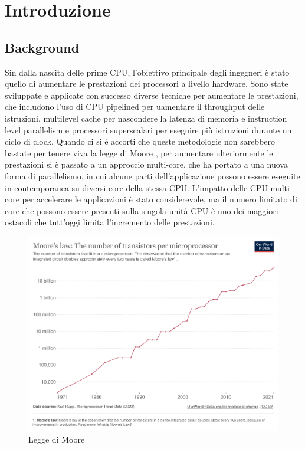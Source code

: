 \chapter{Introduzione}
\label{sec:intro}


\section[Background]{Background}

Sin dalla nascita delle prime \gls{CPU}, l'obiettivo principale degli ingegneri è stato quello di aumentare le prestazioni dei processori a livello hardware. Sono state sviluppate e applicate con successo diverse tecniche per aumentare le prestazioni, che includono l'uso di CPU pipelined per uamentare il throughput delle istruzioni, multilevel cache per nascondere la latenza di memoria e instruction level parallelism e processori superscalari per eseguire più istruzioni durante un ciclo di clock.
Quando ci si è accorti che queste metodologie non sarebbero bastate per tenere viva la legge di Moore \cite[]{Moore:law}, per aumentare ulteriormente le prestazioni si è passato a un approccio multi-core, che ha portato a una nuova forma di parallelismo, in cui alcune parti dell'applicazione possono essere eseguite in contemporanea su diversi core della stessa CPU. L'impatto delle CPU multi-core per accelerare le applicazioni è stato considerevole, ma il numero limitato di core che possono essere presenti sulla singola unità CPU è uno dei maggiori ostacoli che tutt'oggi limita l'incremento delle prestazioni.

\begin{figure}[h]
\centering
\includegraphics[width=.9\linewidth]{images/chapter1/moore_law2.png}
\caption{Legge di Moore}
\label{fig:moore_law}
\end{figure}

